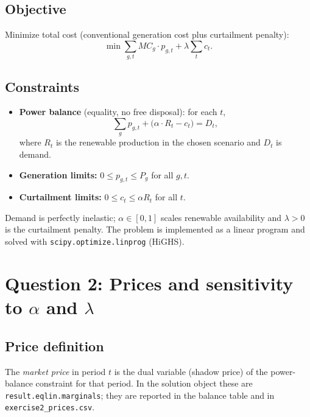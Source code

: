 \documentclass[11pt,a4paper]{article}
\begin{document}
\subsection{Objective}
Minimize total cost (conventional generation cost plus curtailment penalty):
\begin{equation}
  \min \sum_{g,t} MC_g \cdot p_{g,t} + \lambda \sum_t c_t.
\end{equation}

\subsection{Constraints}
\begin{itemize}
  \item \textbf{Power balance} (equality, no free disposal): for each $t$,
    \begin{equation}
      \sum_g p_{g,t} + \bigl(\alpha \cdot R_t - c_t\bigr) = D_t,
    \end{equation}
    where $R_t$ is the renewable production in the chosen scenario and $D_t$ is demand.
  \item \textbf{Generation limits:} $0 \leq p_{g,t} \leq P_g$ for all $g,t$.
  \item \textbf{Curtailment limits:} $0 \leq c_t \leq \alpha R_t$ for all $t$.
\end{itemize}

Demand is perfectly inelastic; $\alpha \in [0,1]$ scales renewable availability and $\lambda > 0$ is the curtailment penalty. The problem is implemented as a linear program and solved with \texttt{scipy.optimize.linprog} (HiGHS).

\section{Question 2: Prices and sensitivity to $\alpha$ and $\lambda$}

\subsection{Price definition}
The \emph{market price} in period $t$ is the dual variable (shadow price) of the power-balance constraint for that period. In the solution object these are \texttt{result.eqlin.marginals}; they are reported in the balance table and in \texttt{exercise2\_prices.csv}.
\end{document}
